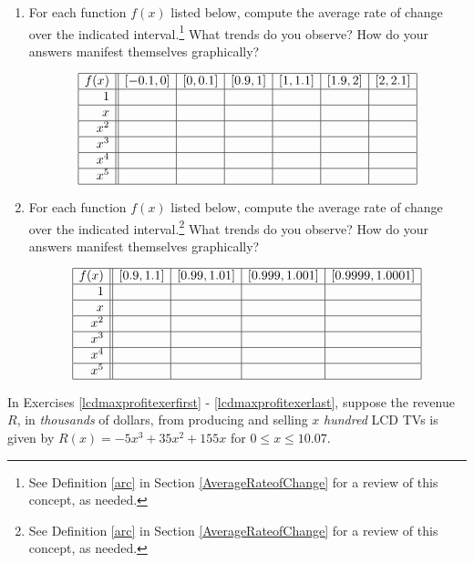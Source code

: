 \documentclass{ximera}
\begin{document}
\begin{enumerate}
\item For each function $f(x)$ listed below, compute the average rate of change over the indicated interval.\footnote{See Definition \ref{arc} in Section \ref{AverageRateofChange} for a review of this concept, as needed.}  What trends do you observe?  How do your answers manifest themselves graphically?

\[ \begin{array}{|r||c|c|c|c|c|c|}  \hline

 f(x) &  [-0.1, 0] & [0, 0.1] &[0.9, 1] & [1, 1.1] & [1.9, 2] & [2, 2.1]  \\ \hline
 1 &&&&&& \\  \hline
 x  &&&&&& \\  \hline
 x^2 &&&&&&  \\  \hline
 x^3 &&&&&& \\  \hline
 x^4 &&&&&& \\ \hline
 x^5 &&&&&& \\ \hline

\end{array} \]


\item \label{monomialarcexercise}For each function $f(x)$ listed below, compute the average rate of change over the indicated interval.\footnote{See Definition \ref{arc} in Section \ref{AverageRateofChange} for a review of this concept, as needed.}  What trends do you observe?  How do your answers manifest themselves graphically?

\[ \begin{array}{|r||c|c|c|c|}  \hline

 f(x) &  [0.9, 1.1] & [0.99, 1.01] &[0.999, 1.001] & [0.9999, 1.0001]  \\ \hline
 1 &&&&   \\  \hline
 x &&&&    \\  \hline
 x^2 &&&&   \\  \hline
 x^3 &&&&   \\  \hline
 x^4 &&&&  \\ \hline
 x^5 &&&&  \\ \hline

\end{array} \]




\setcounter{HW}{\value{enumi}}
\end{enumerate}

\label{LCDmaxprofit} 

In Exercises \ref{lcdmaxprofitexerfirst} - \ref{lcdmaxprofitexerlast}, suppose the revenue $R$, in \textit{thousands} of dollars, from producing and selling $x$ \textit{hundred} LCD TVs is given by $R(x) = -5x^3+35x^2+155x$ for $0 \leq x \leq 10.07$.
\end{document}
